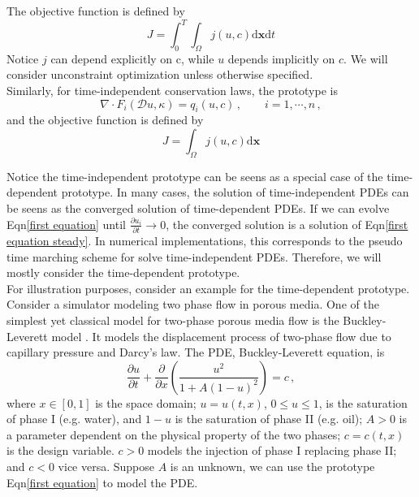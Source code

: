 \documentclass[a4paper,onecolumn]{article}
\theoremstyle{remark}
\begin{document}
\noindent The objective function is defined by
\begin{equation}
    J = \int_0^T \int_\Omega j(u,c) \textrm{d}\mathbf{x}\textrm{d}t
\end{equation}
Notice $j$ can depend explicitly on c, while $u$ depends implicitly on $c$.
We will consider unconstraint optimization unless otherwise specified.\\

\noindent Similarly, for time-independent conservation laws, the prototype is
\begin{equation}
    \nabla \cdot 
    F_i(\mathcal{D} u, \kappa) 
    = q_i(u,c)\,, \qquad i=1,\cdots, n\,,
    \label{first equation steady}
\end{equation}
and the objective function is defined by
\begin{equation}
    J = \int_\Omega j(u,c) \textrm{d}\mathbf{x}
\end{equation}

\noindent Notice the time-independent prototype can be seens as a special case 
of the time-dependent prototype. In many cases, the solution of time-independent PDEs
can be seens as the converged solution of time-dependent PDEs. If we can evolve 
Eqn\eqref{first equation} until $\frac{\partial u_i}{\partial t}\rightarrow 0$,
the converged solution is a solution of Eqn\eqref{first equation steady}.
In numerical implementations, this corresponds to the pseudo time marching scheme
for solve time-independent PDEs. Therefore, we will mostly consider the time-dependent 
prototype.\\

\noindent For illustration purposes, 
consider an example for the time-dependent prototype. Consider 
a simulator modeling two phase flow in porous media.
One of the simplest yet classical model for two-phase porous media flow is the Buckley-Leverett model \cite{Buckley Leverett, Reservoir Simulation Book}. 
It models the displacement process of two-phase flow due to capillary pressure and Darcy's law.
The PDE, Buckley-Leverett equation, is
\begin{equation}
    \frac{\partial u}{\partial t} + \frac{\partial}{\partial x} \left(\frac{u^2}{1+A(1-u)^2}\right) = c\,,
    \label{Buck-Lev eqn}
\end{equation}
where $x\in[0,1]$ is the space domain;
$u = u(t,x)$, $0\le u\le 1$, is the saturation of phase I (e.g. water), 
and $1-u$ is the saturation of phase II (e.g. oil);
$A>0$ is a parameter dependent on the physical property of the two phases;
$c=c(t,x)$ is the design variable. $c>0$ models the injection of phase I replacing phase II; and $c<0$ vice versa.
Suppose $A$ is an unknown, we can use the prototype Eqn\eqref{first equation} to 
model the PDE.\\
\end{document}
